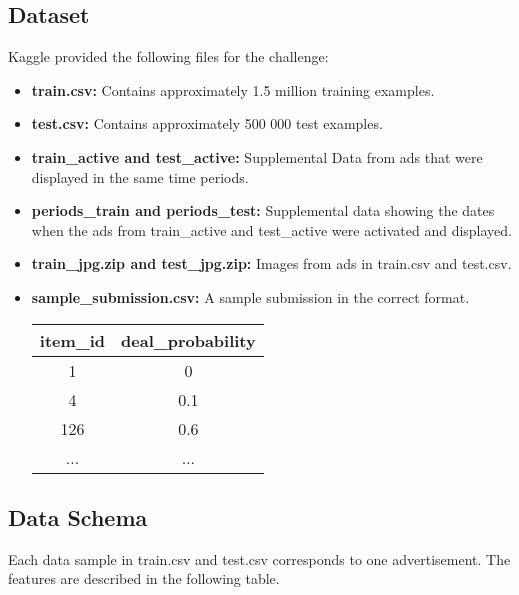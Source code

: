 \documentclass[runningheads]{llncs}
\begin{document}
\subsection{Dataset}
Kaggle provided the following files for the challenge:
\begin{itemize}
	\item \textbf{train.csv:} Contains approximately 1.5 million training examples.
	\item \textbf{test.csv:} Contains approximately 500 000 test examples.
	\item \textbf{train\_active and test\_active:} Supplemental Data from ads that were displayed in the same time periods.
	\item \textbf{periods\_train and periods\_test:} Supplemental data showing the dates when the ads from train\_active and test\_active were activated and displayed.
	\item \textbf{train\_jpg.zip and test\_jpg.zip:} Images from ads in train.csv and test.csv.
	\item \textbf{sample\_submission.csv:} A sample submission in the correct format.\\
	\begin{center}
	\begin{tabular}{|c|c|}
		\hline 
		\textbf{item\_id} & \textbf{deal\_probability} \\ 
		\hline 
		1 & 0 \\ 
		\hline 
		4 & 0.1 \\ 
		\hline 
		126 & 0.6 \\ 
		\hline 
		... & ... \\ 
		\hline 
	\end{tabular} 
	\end{center} 
\end{itemize}

\subsection{Data Schema}  

Each data sample in train.csv and test.csv corresponds to one advertisement. The features are described in the following table.
\end{document}
